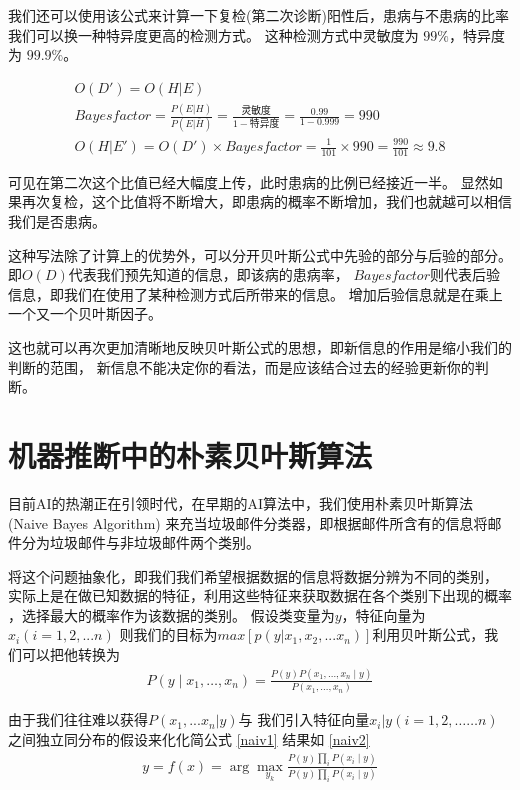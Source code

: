 \documentclass[a4paper,AutoFakeBold,oneside,12pt,fontset=windows]{book}
\begin{document}
我们还可以使用该公式来计算一下复检(第二次诊断)阳性后，患病与不患病的比率
我们可以换一种特异度更高的检测方式。
这种检测方式中灵敏度为 $99\%$，特异度为 $99.9\%$。

\begin{gather*}
	O(D')=O(H|E)\\
	Bayesfactor=\frac{ P(E|H)}{ P(E|\overline{H})}=\frac{\mbox{灵敏度}}{1-\mbox{特异度}}=\frac{0.99}{1-0.999}=990\\
	O(H|E')=O(D')\times{Bayesfactor}=\frac{1}{101}\times990=\frac{990}{101}\approx9.8
\end{gather*}

可见在第二次这个比值已经大幅度上传，此时患病的比例已经接近一半。
显然如果再次复检，这个比值将不断增大，即患病的概率不断增加，我们也就越可以相信我们是否患病。

这种写法除了计算上的优势外，可以分开贝叶斯公式中先验的部分与后验的部分。
即$O(D)$代表我们预先知道的信息，即该病的患病率，
$Bayesfactor$则代表后验信息，即我们在使用了某种检测方式后所带来的信息。
增加后验信息就是在乘上一个又一个贝叶斯因子。

这也就可以再次更加清晰地反映贝叶斯公式的思想，即新信息的作用是缩小我们的判断的范围，
新信息不能决定你的看法，而是应该结合过去的经验更新你的判断。

\section{机器推断中的朴素贝叶斯算法}
目前AI的热潮正在引领时代，在早期的AI算法中，我们使用朴素贝叶斯算法(Naive Bayes Algorithm)
来充当垃圾邮件分类器，即根据邮件所含有的信息将邮件分为垃圾邮件与非垃圾邮件两个类别。

将这个问题抽象化，即我们我们希望根据数据的信息将数据分辨为不同的类别，
实际上是在做已知数据的特征，利用这些特征来获取数据在各个类别下出现的概率
，选择最大的概率作为该数据的类别。
假设类变量为$y$，特征向量为$x_i(i=1,2,...n)$
则我们的目标为$max[p(y|x_1,x_2,...x_n)]$利用贝叶斯公式，我们可以把他转换为
\begin{gather}
	\label{naiv1}
	P\left(y\mid x_{1}, \ldots, x_{n}\right)=\frac{P(y) P\left(x_{1}, \ldots, x_{n} \mid y\right)}{P\left(x_{1}, \ldots, x_{n}\right)}
\end{gather}

由于我们往往难以获得$P(x_1,...x_n|y)与$
我们引入特征向量$x_i|y(i=1,2,……n)$之间独立同分布的假设来化化简公式 \ref{naiv1}
结果如 \ref{naiv2}
\begin{gather}
	\label{naiv2}
	y=f(x)=\arg \max _{y_{k}} \frac{P\left(y\right) \prod_{i} P\left(x_i \mid y\right)}{P\left(y\right) \prod_{i} P\left(x_i \mid y\right)}
\end{gather}
\end{document}
